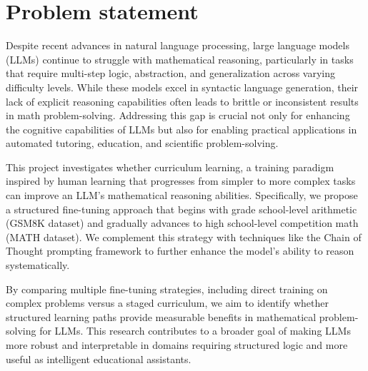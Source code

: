 \section{Problem statement}
Despite recent advances in natural language processing, large language models (LLMs) continue to struggle with mathematical reasoning, particularly in tasks that require multi-step logic, abstraction, and generalization across varying difficulty levels. While these models excel in syntactic language generation, their lack of explicit reasoning capabilities often leads to brittle or inconsistent results in math problem-solving. Addressing this gap is crucial not only for enhancing the cognitive capabilities of LLMs but also for enabling practical applications in automated tutoring, education, and scientific problem-solving.

This project investigates whether curriculum learning, a training paradigm inspired by human learning that progresses from simpler to more complex tasks can improve an LLM's mathematical reasoning abilities. Specifically, we propose a structured fine-tuning approach that begins with grade school-level arithmetic (GSM8K dataset) and gradually advances to high school-level competition math (MATH dataset). We complement this strategy with techniques like the Chain of Thought prompting framework to further enhance the model’s ability to reason systematically.

By comparing multiple fine-tuning strategies, including direct training on complex problems versus a staged curriculum, we aim to identify whether structured learning paths provide measurable benefits in mathematical problem-solving for LLMs. This research contributes to a broader goal of making LLMs more robust and interpretable in domains requiring structured logic and more useful as intelligent educational assistants.
